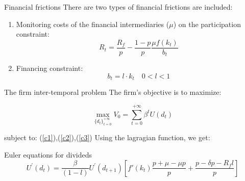 \documentclass{beamer}
\begin{document}
\begin{frame}{Financial frictions}
    There are two types of financial frictions are included:
    \begin{enumerate}
        \item Monitoring costs of the financial intermediaries (\(\mu\)) on the participation constraint:
            \begin{equation}
                R_t=\frac{R_f}{p}  -\frac{ 1-p }{ p }\frac{\mu f(k_t)}{b_t} \label{c2}
        \end{equation}
        \item Financing constraint:
        \begin{equation}
            b_t = l \cdot k_t \quad 0<l<1 \label{c3}
        \end{equation}
    \end{enumerate}
\end{frame}
\begin{frame}{The firm inter-temporal problem}
     The firm's objective is to maximize:

\[
\max_{{\{d_{t}\}}_{t=0}^{+\infty}}V_0 = \sum_{t=0}^{+\infty}{\beta^t U(d_t)}
\]

subject to: (\ref{c1}),(\ref{c2}),(\ref{c3})
Using the lagragian function, we get:
\begin{block}{Euler equations for divideds}
    \begin{equation}
        U^{\prime}(d_{t})=\frac{\beta}{\left(1-l\right)} U^{\prime}(d_{t+1})\left[ f'(k_{t})\frac{p + \mu - \mu p}{p} + \frac{p - \delta p - R_f l}{p} \right]
    \end{equation}
\end{block}
\end{frame}
\end{document}
